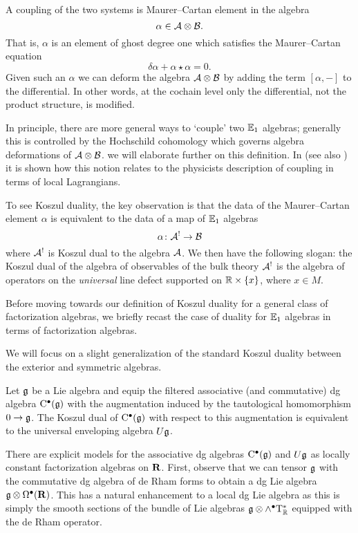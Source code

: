 A coupling of the two systems is Maurer--Cartan element in the algebra
\[
\alpha \in \mathcal A \otimes \mathcal B .
\]
That is, $\alpha$ is an element of ghost degree one which satisfies the Maurer--Cartan equation
\[
\delta \alpha + \alpha \star \alpha = 0 .
\]
Given such an $\alpha$ we can deform the algebra $\mathcal A \otimes \mathcal B$ by adding the term $[\alpha,-]$ to the differential. 
In other words, at the cochain level only the differential, not the product structure, is modified. 

In principle, there are more general ways to `couple' two $\mathbb E_1$ algebras; generally this is controlled by the Hochschild cohomology which governs algebra deformations of $\mathcal A \otimes \mathcal B$. 
we will elaborate further on this definition. 
In \cite{CG1} (see also \cite{PWkoszul}) it is shown how this notion relates to the physicists description of coupling in terms of local Lagrangians.

To see Koszul duality, the key observation is that the data of the Maurer--Cartan element $\alpha$ is equivalent to the data of a map of $\mathbb E_1$ algebras
\[
\alpha \colon \mathcal A^! \to \mathcal B 
\]
where $\mathcal A^!$ is Koszul dual to the algebra $\mathcal A$. 
We then have the following slogan: the Koszul dual of the algebra of observables of the bulk theory $\mathcal A^!$ is the algebra of operators on the {\em universal} line defect supported on $\mathbb R \times \{x\}$, where $x \in M$.  

\parsec[s:celine]

Before moving towards our definition of Koszul duality for a general class of factorization algebras, we briefly recast the case of duality for $\mathbb E_1$ algebras in terms of factorization algebras. 

We will focus on a slight generalization of the standard Koszul duality between the exterior and symmetric algebras.

\begin{prop}
Let $\mathfrak{g}$ be a Lie algebra and equip the filtered associative (and commutative) dg algebra ${\rm C}^\bullet(\mathfrak g)$ with the augmentation induced by the tautological homomorphism $0 \to \mathfrak{g}$.
The Koszul dual of ${\rm C}^\bullet(\mathfrak{g})$ with respect to this augmentation is equivalent to the universal enveloping algebra $U \mathfrak g$. 
\end{prop}

There are explicit models for the associative dg algebras ${\rm C}^\bullet(\mathfrak{g})$ and $U \mathfrak{g}$ as locally constant factorization algebras on $\mathbf{R}$.
First, observe that we can tensor $\mathfrak g$ with the commutative dg algebra of de Rham forms to obtain a dg Lie algebra $\mathfrak g \otimes \Omega^\bullet(\mathbf{R})$. 
This has a natural enhancement to a local dg Lie algebra as this is simply the smooth sections of the bundle of Lie algebras $\mathfrak g \otimes \wedge^\bullet {\rm T}^*_\mathbb R$ equipped with the de Rham operator.

